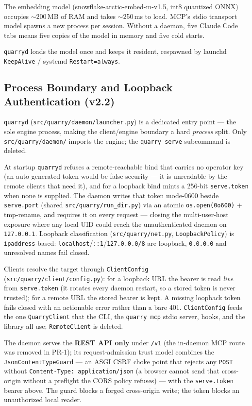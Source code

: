 \documentclass[a4paper,10pt]{article}
\newcommand{\modpath}[1]{\texttt{src/quarry/#1}}
\begin{document}
The embedding model (snowflake-arctic-embed-m-v1.5, int8 quantized
ONNX) occupies $\sim$200\,MB of RAM and takes $\sim$250\,ms to load.
MCP's stdio transport model spawns a new process per session.  Without
a daemon, five Claude Code tabs means five copies of the model in
memory and five cold starts.

\texttt{quarryd} loads the model once and keeps it resident, respawned
by launchd \texttt{KeepAlive} / systemd \texttt{Restart=always}.

\subsection{Process Boundary and Loopback Authentication (v2.2)}
\label{sec:proc-boundary}

\texttt{quarryd} (\modpath{daemon/launcher.py}) is a dedicated entry
point --- the sole engine process, making the client/engine boundary a
hard \emph{process} split.  Only \modpath{daemon/} imports the engine;
the \texttt{quarry serve} subcommand is deleted.

At startup \texttt{quarryd} refuses a remote-reachable bind that carries
no operator key (an auto-generated token would be false security --- it is
unreadable by the remote clients that need it), and for a loopback bind
mints a 256-bit \texttt{serve.token} when none is supplied.  The daemon
writes that token mode-0600 beside \texttt{serve.port} (shared
\modpath{run\_dir.py}) via an atomic \texttt{os.open(0o600)} +
tmp-rename, and requires it on every request --- closing the
multi-user-host exposure where any local UID could reach the
unauthenticated daemon on \texttt{127.0.0.1}.  Loopback classification
(\modpath{net.py}, \texttt{LoopbackPolicy}) is \texttt{ipaddress}-based:
\texttt{localhost}/\texttt{::1}/\texttt{127.0.0.0/8} are loopback,
\texttt{0.0.0.0} and unresolved names fail closed.

Clients resolve the target through \texttt{ClientConfig}
(\modpath{client/config.py}): for a loopback URL the bearer is read
\emph{live} from \texttt{serve.token} (it rotates every daemon restart,
so a stored token is never trusted); for a remote URL the stored bearer
is kept.  A missing loopback token fails closed with an actionable error
rather than a bare 401.  \texttt{ClientConfig} feeds the one
\texttt{QuarryClient} that the CLI, the \texttt{quarry mcp} stdio server,
hooks, and the library all use; \texttt{RemoteClient} is deleted.

The daemon serves the \textbf{REST API only} under \texttt{/v1} (the
in-daemon MCP route was removed in PR-1); its request-admission trust model
combines the \texttt{JsonContentTypeGuard} --- an ASGI CSRF choke point
that rejects any \texttt{POST} without \texttt{Content-Type:
application/json} (a browser cannot send that cross-origin without a
preflight the CORS policy refuses) --- with the \texttt{serve.token} bearer
above.  The guard blocks a forged cross-origin write; the token blocks an
unauthorized local reader.
\end{document}
